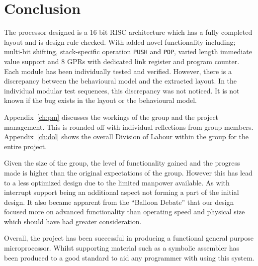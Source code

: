 

\chapter{Conclusion}

The processor designed is a 16 bit RISC architecture which has a fully completed layout and is design rule checked. 
With added novel functionality including; multi-bit shifting, stack-specific operation \texttt{PUSH} and \texttt{POP}, varied length immediate value support and 8 GPRs with dedicated link register and program counter. 
Each module has been individually tested and verified.
However, there is a discrepancy between the behavioural model and the extracted layout.
In the individual modular test sequences, this discrepancy was not noticed. 
It is not known if the bug exists in the layout or the behavioural model. 

Appendix~\ref{ch:pm} discusses the workings of the group and the project management.
This is rounded off with individual reflections from group members.
Appendix~\ref{ch:dol} shows the overall Division of Labour within the group for the entire project.

Given the size of the group, the level of functionality gained and the progress made is higher than the original expectations of the group. 
However this has lead to a less optimized design due to the limited manpower available. 
As with interrupt support being an additional aspect not forming a part of the initial design. 
It also became apparent from the ``Balloon Debate'' that our design focused more on advanced functionality than operating speed and physical size which should have had greater consideration. 

Overall, the project has been successful in producing a functional general purpose microprocessor.  
Whilst supporting material such as a symbolic assembler has been produced to a good standard to aid any programmer with using this system. 

